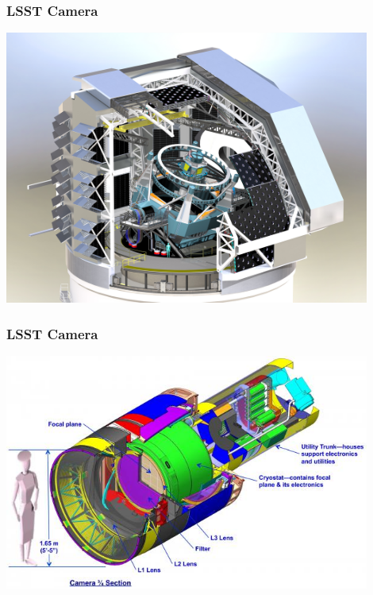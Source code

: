 \documentclass{beamer}
\begin{document}
{

    \frame
    {
        \frametitle{LSST Camera}
     
        \begin{center}
            \includegraphics[width=0.9\textwidth]{Dome_and_Telescope_sm.jpg}
            \newline
        \end{center}

    }

}

{

    \frame
    {
        \frametitle{LSST Camera}
     
        \begin{center}
            \includegraphics[width=0.9\textwidth]{Camera_Layout-full.jpg}
            \newline
        \end{center}

    }

}
\end{document}
